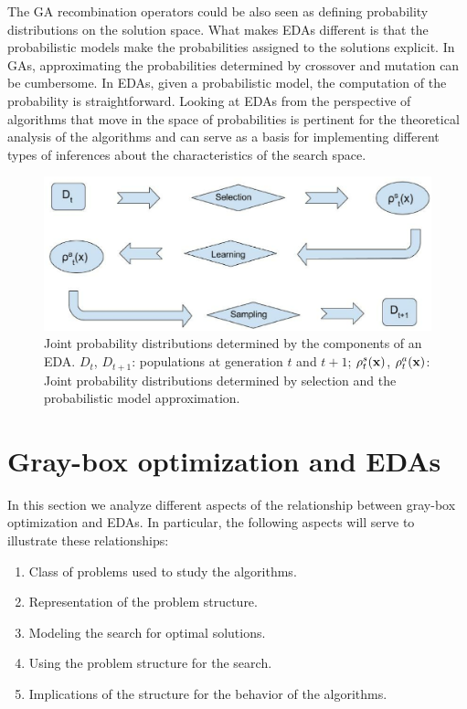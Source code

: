 \documentclass{article} %
\begin{document}
 The GA recombination operators could be also seen as defining probability distributions on the solution space. What makes EDAs different is that the probabilistic models make the  probabilities assigned to the solutions explicit. In GAs, approximating the probabilities determined by crossover and mutation can be cumbersome. In EDAs, given a probabilistic model, the computation of the probability is straightforward. Looking at EDAs from the perspective of algorithms that move in the space of probabilities is pertinent for the theoretical analysis of the algorithms \cite{Echegoyen_et_al:2012a,Echegoyen_et_al:2013,Lozada_and_Santana:2011,Muehlenbein_and_Mahnig:2001b,Muehlenbein_and_Mahnig:2002a} and can serve as a basis for implementing different types of inferences about the characteristics of the search space. 

 
\begin{figure}
\begin{center}
\includegraphics[width=14.0cm]{EDAsFlowChart.eps}
\caption{Joint probability distributions determined by the components of an   EDA. $D_{t}$, $D_{t+1}$: populations at generation $t$ and $t+1$; $\rho_{t}^s({\bf{x}})$, $\rho_{t}^a({\bf{x}})$: Joint probability distributions determined by selection and the probabilistic model  approximation.}
\label{fig:SELINEDAS}
\end{center}
\end{figure}


\section{Gray-box optimization and EDAs} \label{sec:GRAY_EDA}

 In this section we analyze different aspects of  the relationship between  gray-box optimization and EDAs. In particular, the following aspects will serve to illustrate these relationships:

 \begin{enumerate}
   \item Class of problems used to study the algorithms.
   \item Representation of the problem structure.
   \item Modeling the search for optimal solutions.
   \item Using the problem structure for the search. 
   \item Implications of the structure for the behavior of the algorithms. 
 \end{enumerate}
\end{document}
